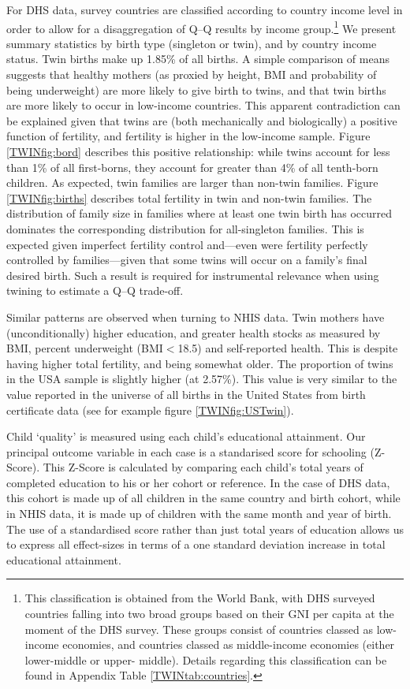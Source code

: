 \documentclass[subeqn]{article}
\begin{document}
\begin{spacing}{1.4}
For DHS data, survey countries are classified according to country income level 
in order to allow for a disaggregation of Q--Q results by income group.\footnote{
This classification is obtained from the World Bank, with DHS surveyed countries 
falling into two broad groups based on their GNI per capita at the moment of the 
DHS survey. These groups consist of countries classed as low-income economies, 
and countries classed as middle-income economies (either lower-middle or upper-%
middle). Details regarding this classification can be found in Appendix Table 
\ref{TWINtab:countries}.} We present summary statistics by birth type (singleton 
or twin), and by country income status. Twin births make up 1.85\% of all births.
A simple comparison of means suggests that healthy mothers (as proxied by height, 
BMI and probability of being underweight) are more likely to give birth to twins, 
and that twin births are more likely to occur in low-income countries. This 
apparent contradiction can be explained given that twins are (both mechanically 
and biologically) a positive function of fertility, and fertility is higher in 
the low-income sample. Figure \ref{TWINfig:bord} describes this positive 
relationship: while twins account for less than 1\% of all first-borns, they 
account for greater than 4\% of all tenth-born children. As expected, twin 
families are larger than non-twin families. Figure \ref{TWINfig:births} 
describes total fertility in twin and non-twin families. The distribution of 
family size in families where at least one twin birth has occurred dominates the 
corresponding distribution for all-singleton families.  This is expected given 
imperfect fertility control and---even were fertility perfectly controlled by 
families---given that some twins will occur on a family's final desired birth. 
Such a result is required for instrumental relevance when using twining to 
estimate a Q--Q trade-off.

Similar patterns are observed when turning to NHIS data.  Twin mothers have
(unconditionally) higher education, and greater health stocks as measured by
BMI, percent underweight (BMI$<$18.5) and self-reported health.  This is 
despite having higher total fertility, and being somewhat older.  The 
proportion of twins in the USA sample is slightly higher (at 2.57\%). This
value is very similar to the value reported in the universe of all births in
the United States from birth certificate data (see for example figure 
\ref{TWINfig:USTwin}).

Child `quality' is measured using each child's educational attainment. Our 
principal outcome variable in each case is a standarised score for schooling 
(Z-Score). This Z-Score is calculated by comparing each child's total years of 
completed education to his or her cohort or reference.  In the case of DHS data,
this cohort is made up of all children in the same country and birth cohort, 
while in NHIS data, it is made up of children with the same month and year of 
birth. The use of a standardised score rather than just total years of education
allows us to express all effect-sizes in terms of a one standard deviation 
increase in total educational attainment.


\end{spacing}
\end{document}
